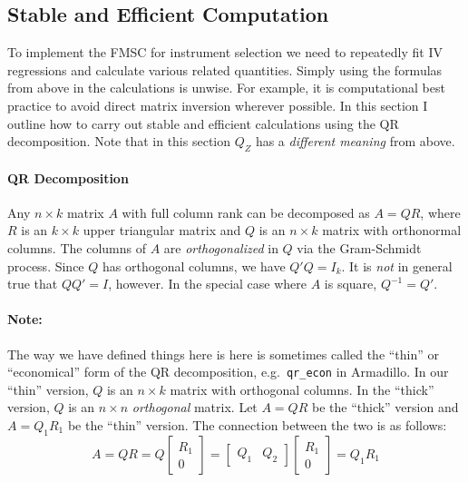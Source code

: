 \documentclass[12pt]{article}
\theoremstyle{definition}
\begin{document}
\subsection{Stable and Efficient Computation}
To implement the FMSC for instrument selection we need to repeatedly fit IV regressions and calculate various related quantities. Simply using the formulas from above in the calculations is unwise. For example, it is computational best practice to avoid direct matrix inversion wherever possible. In this section I outline how to carry out stable and efficient calculations using the QR decomposition. Note that in this section $Q_Z$ has a \emph{different meaning} from above.

\paragraph{QR Decomposition} Any $n\times k$ matrix $A$ with full column rank can be decomposed as $A = QR$, where $R$ is an $k\times k$ upper triangular matrix and $Q$ is an $n\times k$ matrix with orthonormal columns. The columns of $A$ are \emph{orthogonalized} in $Q$ via the Gram-Schmidt process. Since $Q$ has orthogonal columns, we have $Q'Q = I_k$. It is \emph{not} in general true that $QQ' = I$, however. In the special case where $A$ is square, $Q^{-1} = Q'$.

\paragraph{Note:} The way we have defined things here is here is sometimes called the ``thin'' or ``economical'' form of the QR decomposition, e.g.\ \texttt{qr\_econ} in Armadillo. In our ``thin'' version, $Q$ is an $n\times k$ matrix with orthogonal columns. In the ``thick'' version, $Q$ is an $n\times n$ \emph{orthogonal} matrix. Let $A = QR$ be the ``thick'' version and $A = Q_1 R_1$ be the ``thin'' version. The connection between the two is as follows:
  $$A = QR = Q \left[\begin{array}
    {c} R_1 \\ 0 
  \end{array} \right] = \left[  \begin{array}
    {cc} Q_1 & Q_2
  \end{array}\right]\left[\begin{array}
    {c} R_1 \\ 0 
  \end{array} \right] = Q_1 R_1$$
\end{document}
